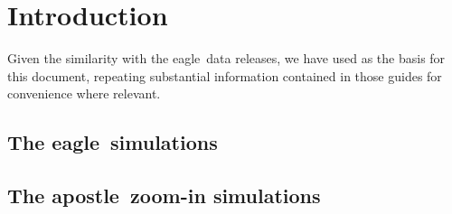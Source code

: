 \documentclass[10pt, a4paper]{article}
\newcommand{\eagle}{{\sc eagle}}
\newcommand{\apostle}{{\sc apostle}}
\begin{document}
\maketitle

\begin{abstract}
This manual accompanies the release of the group catalogs and particle data for
the \apostle\ suite of cosmological hydrodynamical zoom-in simulations of galaxy
formation in Local Group-like regions. The galaxy formation model used in \apostle\
is closely related to that used in the \eagle\ project. We describe how to download
these data and how to extract information from them, emphasising differences relative
to the similar \eagle\ public data. The group catalogs are hosted on the same {\sc sql}
database as the equivalent from \eagle. We provide example routines for reading the
tables, and some simple analyses, in {\sc python}.
\end{abstract}

\section{Introduction}
Given the similarity with the \eagle\ data releases, we have used \cite{2016A&C....15...72M,2017arXiv170609899T} as the basis for this document, repeating substantial information contained in those guides for convenience where relevant.

\subsection{The \eagle\ simulations}
\subsection{The \apostle\ zoom-in simulations}
\end{document}
